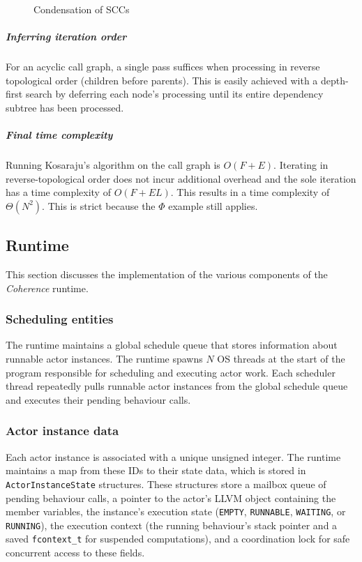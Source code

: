 \documentclass[a4paper,12pt,fleqn]{article}
\begin{document}
\begin{figure}[H]
{
    }
    \caption{Condensation of SCCs}
    \label{fig:scc_condensation}
\end{figure}



\subparagraph{Inferring iteration order\\}
For an acyclic call graph, a single pass suffices when processing in reverse topological order (children before parents). This is easily achieved with a depth-first search by deferring each node's processing until its entire dependency subtree has been processed.

\subparagraph{Final time complexity\\}
Running Kosaraju's algorithm on the call graph is $O(F + E)$. Iterating in reverse-topological order does not incur additional overhead and the sole iteration has a time complexity of $O(F + EL)$. This results in a time complexity of $\Theta(N^2)$. This is strict because the $\Phi$ example still applies.
\subsection{Runtime} \label{sec:runtime}
This section discusses the implementation of the various components of the \textit{Coherence} runtime.
\subsubsection{Scheduling entities}
The runtime maintains a global schedule queue that stores information about runnable actor instances. The runtime spawns $N$ OS threads at the start of the program  responsible for scheduling and executing actor work. Each scheduler thread repeatedly pulls runnable actor instances from the global schedule queue and executes their pending behaviour calls.
\subsubsection{Actor instance data}
Each actor instance is associated with a unique unsigned integer. The runtime maintains a map from these IDs to their state data, which is stored in \texttt{ActorInstanceState} structures. These structures store a mailbox queue of pending behaviour calls, a pointer to the actor's LLVM object containing the member variables, the instance's execution state (\texttt{EMPTY}, \texttt{RUNNABLE}, \texttt{WAITING}, or \texttt{RUNNING}), the execution context (the running behaviour's stack pointer and a saved \texttt{fcontext\_t} for suspended computations), and a coordination lock for safe concurrent access to these fields.
\end{document}
